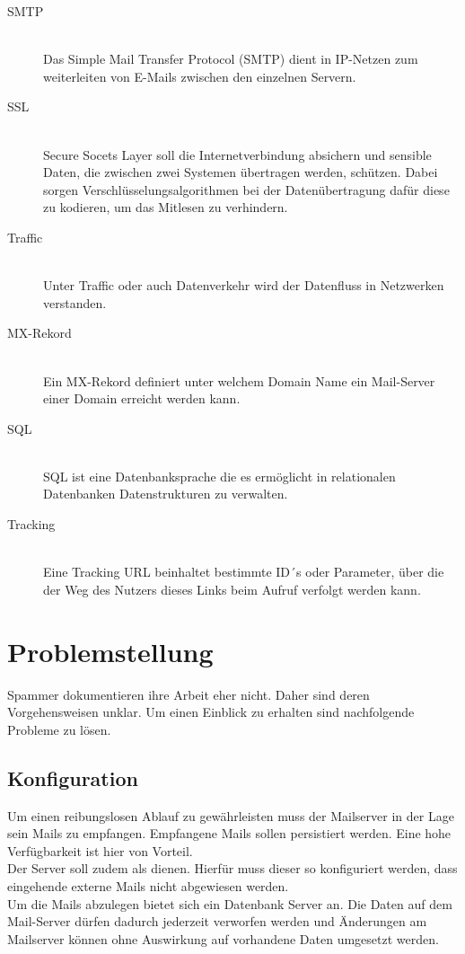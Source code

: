 \documentclass[a4paper,11pt,singlespacing]{article}
\begin{document}
\begin{description}
	\item[SMTP\label{itm:SMTP}]\hfill \\
		Das Simple Mail Transfer Protocol (SMTP) dient in IP-Netzen zum weiterleiten von E-Mails zwischen den einzelnen Servern. \cite{smtp}
	\item[SSL\label{itm:SSL}]\hfill \\
		Secure Socets Layer soll die Internetverbindung absichern und sensible Daten, die zwischen zwei Systemen übertragen werden, schützen. Dabei sorgen Verschlüsselungsalgorithmen bei der Datenübertragung dafür diese zu kodieren, um das Mitlesen zu verhindern. \cite{ssl}
	\item[Traffic\label{itm:Traffic}]\hfill \\
		Unter Traffic oder auch Datenverkehr wird der Datenfluss in Netzwerken verstanden. \cite{traffic}
	\item[MX-Rekord\label{itm:MX-Rekord}]\hfill \\
		Ein MX-Rekord definiert unter welchem Domain Name ein Mail-Server einer Domain erreicht werden kann. \cite{mxRekord}
	\item[SQL\label{itm:SQL}]\hfill \\
		SQL ist eine Datenbanksprache die es ermöglicht in relationalen Datenbanken Datenstrukturen zu verwalten. \cite{sql}
	\item[Tracking\label{itm:Tracking}]\hfill \\
		Eine Tracking URL beinhaltet bestimmte ID´s oder Parameter, über die der Weg des Nutzers dieses Links beim Aufruf verfolgt werden kann. \cite{tracking}
	\end{description}

\newpage


\section{Problemstellung}\label{sec:Problemstellung}
	Spammer dokumentieren ihre Arbeit eher nicht.
	Daher sind deren Vorgehensweisen unklar.
	Um einen Einblick zu erhalten sind nachfolgende Probleme zu lösen.

	\subsection{Konfiguration}\label{sec:ProblemstellungKonfiguration}
		Um einen reibungslosen Ablauf zu gewährleisten muss der Mailserver in der Lage sein Mails zu empfangen.
		Empfangene Mails sollen persistiert werden.
		Eine hohe Verfügbarkeit ist hier von Vorteil.
		\\
		Der Server soll zudem als  dienen.
		Hierfür muss dieser so konfiguriert werden, dass eingehende externe Mails nicht abgewiesen werden.
		\\
		Um die Mails abzulegen bietet sich ein Datenbank Server an.
		Die Daten auf dem Mail-Server dürfen dadurch jederzeit verworfen werden und Änderungen am Mailserver können ohne Auswirkung auf vorhandene Daten umgesetzt werden.
\end{document}
